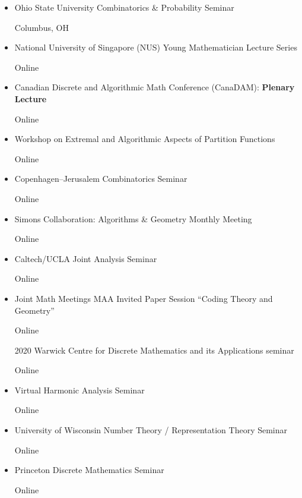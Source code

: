 \documentclass[11pt]{amsart}
\newcommand{\rightloc}[1]{\hfill {\raggedright #1}}
\begin{document}
\begin{itemize}[leftmargin=.4in,itemsep=5pt,topsep=0pt,label={}]
\item
Ohio State University Combinatorics \& Probability Seminar
\rightloc{Columbus, OH}

\item 
National University of Singapore (NUS) Young Mathematician Lecture Series
\rightloc{Online} 


\item 
Canadian Discrete and Algorithmic Math Conference (CanaDAM): \textbf{Plenary Lecture} \rightloc{Online}

\item Workshop on Extremal and Algorithmic Aspects of Partition Functions
\rightloc{Online}

\item 
Copenhagen--Jerusalem Combinatorics Seminar \rightloc{Online}

\item Simons Collaboration: Algorithms \& Geometry Monthly Meeting \rightloc{Online}

\item Caltech/UCLA Joint Analysis Seminar \rightloc{Online}

\item Joint Math Meetings MAA Invited Paper Session ``Coding Theory and Geometry''
\rightloc{Online}

\item[2020]
Warwick Centre for Discrete Mathematics and its Applications seminar \rightloc{Online}

\item Virtual Harmonic Analysis Seminar \rightloc{Online}


\item University of Wisconsin Number Theory / Representation Theory Seminar \rightloc{Online}


\item Princeton Discrete Mathematics Seminar \rightloc{Online}



\end{itemize}
\end{document}
